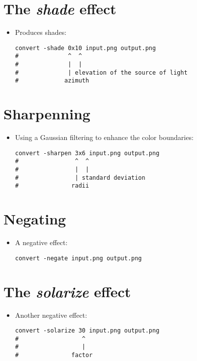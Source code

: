 \section{The \emph{shade} effect}

\begin{itemize}
\item Produces shades:
\begin{lstlisting}
convert -shade 0x10 input.png output.png
#              ^  ^
#              |  |
#              | elevation of the source of light
#             azimuth
\end{lstlisting}

\end{itemize}

\section{Sharpenning}

\begin{itemize}
\item Using a Gaussian filtering to enhance the color boundaries:
\begin{lstlisting}
convert -sharpen 3x6 input.png output.png
#                ^  ^
#                |  |
#                | standard deviation
#               radii
\end{lstlisting}

\end{itemize}

\section{Negating}

\begin{itemize}
\item A negative effect:
\begin{lstlisting}
convert -negate input.png output.png
\end{lstlisting}

\end{itemize}

\section{The \emph{solarize} effect}

\begin{itemize}
\item Another negative effect:
\begin{lstlisting}
convert -solarize 30 input.png output.png
#                  ^
#                  |
#               factor
\end{lstlisting}

\end{itemize}

